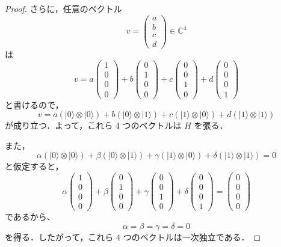 \documentclass[dvipdfmx,a4paper]{jsarticle}
\theoremstyle{mystyle}
\begin{document}
\begin{proof}
\medskip
\noindent
さらに，任意のベクトル
\[
v=
\begin{pmatrix}
a\\
b\\
c\\
d
\end{pmatrix}
\in \mathbb{C}^4
\]
は
\[
v
=
a
\begin{pmatrix}
1\\0\\0\\0
\end{pmatrix}
+b
\begin{pmatrix}
0\\1\\0\\0
\end{pmatrix}
+c
\begin{pmatrix}
0\\0\\1\\0
\end{pmatrix}
+d
\begin{pmatrix}
0\\0\\0\\1
\end{pmatrix}
\]
と書けるので，
\[
v
=
a(|0\rangle\otimes|0\rangle)
+b(|0\rangle\otimes|1\rangle)
+c(|1\rangle\otimes|0\rangle)
+d(|1\rangle\otimes|1\rangle)
\]
が成り立つ．よって，これら 4 つのベクトルは $H$ を張る．

\medskip
\noindent
また，
\[
\alpha(|0\rangle\otimes|0\rangle)
+\beta(|0\rangle\otimes|1\rangle)
+\gamma(|1\rangle\otimes|0\rangle)
+\delta(|1\rangle\otimes|1\rangle)
=0
\]
と仮定すると，
\[
\alpha
\begin{pmatrix}
1\\0\\0\\0
\end{pmatrix}
+\beta
\begin{pmatrix}
0\\1\\0\\0
\end{pmatrix}
+\gamma
\begin{pmatrix}
0\\0\\1\\0
\end{pmatrix}
+\delta
\begin{pmatrix}
0\\0\\0\\1
\end{pmatrix}
=
\begin{pmatrix}
0\\0\\0\\0
\end{pmatrix}
\]
であるから、
\[
\alpha=\beta=\gamma=\delta=0
\]
を得る．したがって，これら 4 つのベクトルは一次独立である．


\end{proof}
\end{document}

